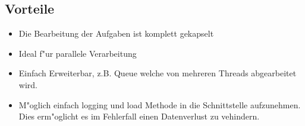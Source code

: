 \subsection{Vorteile}
\begin{itemize}
	\item Die Bearbeitung der Aufgaben ist komplett gekapselt
	\item Ideal f"ur parallele Verarbeitung
	\item Einfach Erweiterbar, z.B. Queue welche von mehreren Threads abgearbeitet wird. 
	\item M"oglich einfach logging und load Methode in die Schnittstelle aufzunehmen. Dies erm"oglicht es im Fehlerfall einen Datenverlust zu vehindern. 
\end{itemize}